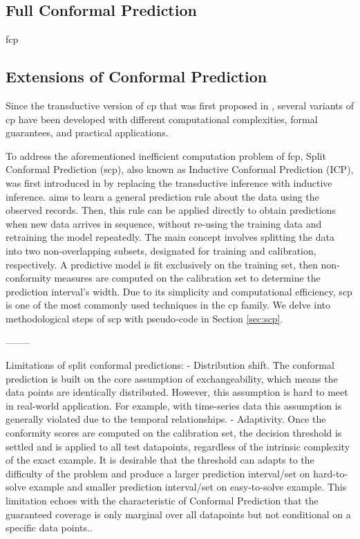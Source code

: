 \documentclass[a4paper,oneside,bibliography=totoc]{scrbook}
\begin{document}
\subsection{Full Conformal Prediction}
\gls{fcp}


\subsection{Extensions of Conformal Prediction}
Since the transductive version of \gls{cp} that was first proposed in \cite{gammerman1998learning}, several variants of \gls{cp} have been developed with different computational complexities, formal guarantees, and practical applications.

To address the aforementioned inefficient computation problem of \gls{fcp}, Split Conformal Prediction (\gls{scp}), also known as Inductive Conformal Prediction (ICP), was first introduced in \cite{papadopoulos2002inductive} by replacing the transductive inference with inductive inference.  aims to learn a general prediction rule about the data using the observed records. Then, this rule can be applied directly to obtain predictions when new data arrives in sequence, without re-using the training data and retraining the model repeatedly. The main concept involves splitting the data into two non-overlapping subsets, designated for training and calibration, respectively. A predictive model is fit exclusively on the training set, then non-conformity measures are computed on the calibration set to determine the prediction interval's width. Due to its simplicity and computational efficiency, \gls{scp} is one of the most commonly used techniques in the \gls{cp} family. We delve into methodological steps of \gls{scp} with pseudo-code in Section \ref{sec:scp}.

--------

Limitations of split conformal predictions:
- Distribution shift. The conformal prediction is built on the core assumption of exchangeability, which means the data points are identically distributed. However, this assumption is hard to meet in real-world application. For example, with time-series data this assumption is generally violated due to the temporal relationships. 
- Adaptivity. Once the conformity scores are computed on the calibration set, the decision threshold is settled and is applied to all test datapoints, regardless of the intrinsic complexity of the exact example. It is desirable that the threshold can adapts to the difficulty of the problem and produce a larger prediction interval/set on hard-to-solve example and smaller prediction interval/set on easy-to-solve example. This limitation echoes with the characteristic of Conformal Prediction that the guaranteed coverage is only marginal over all datapoints but not conditional on a specific data points..
\end{document}
